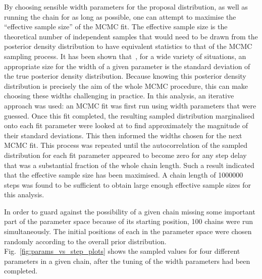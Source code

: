 By choosing sensible width parameters for the proposal distribution, as well as running the chain for as long as possible, one can attempt to maximise the ``effective sample size'' of the MCMC fit. The effective sample size is the theoretical number of independent samples that would need to be drawn from the posterior density distribution to have equivalent statistics to that of the MCMC sampling process. It has been shown that~\cite{gelmanChapter11Basics2013}, for a wide variety of situations, an appropriate size for the width of a given parameter is the standard deviation of the true posterior density distribution. %
Because knowing this posterior density distribution is precisely the aim of the whole MCMC procedure, this can make choosing these widths challenging in practice. In this analysis, an iterative approach was used: an MCMC fit was first run using width parameters that were guessed. Once this fit completed, the resulting sampled distribution marginalised onto each fit parameter were looked at to find approximately the magnitude of their standard deviations. This then informed the widths chosen for the next MCMC fit. This process was repeated until the autocorrelation of the sampled distribution for each fit parameter appeared to become zero for any step delay that was a substantial fraction of the whole chain length. Such a result indicated that the effective sample size has been maximised. A chain length of \num{1000000} steps was found to be sufficient to obtain large enough effective sample sizes for this analysis.

In order to guard against the possibility of a given chain missing some important part of the parameter space because of its starting position, 100 chains were run simultaneously. The initial positions of each in the parameter space were chosen randomly according to the overall prior distribution. Fig.~\ref{fig:params_vs_step_plots} shows the sampled values for four different parameters in a given chain, after the tuning of the width parameters had been completed.


